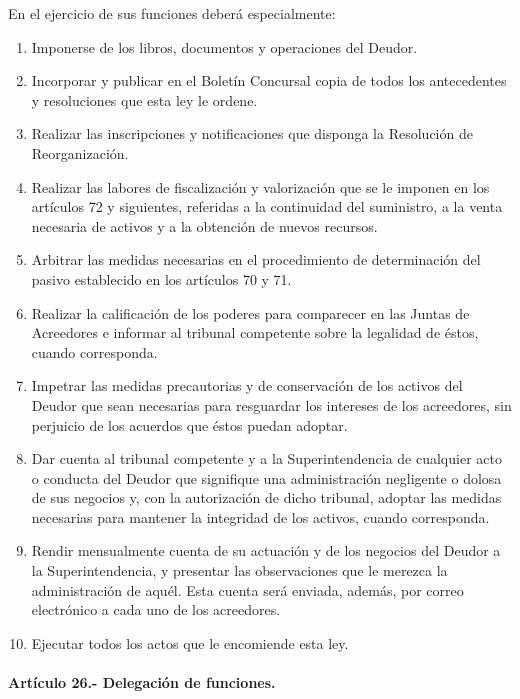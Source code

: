 \documentclass[
]{book}
\begin{document}
En el ejercicio de sus funciones deberá especialmente:

\begin{enumerate}
\def\labelenumi{\arabic{enumi})}
\item
  Imponerse de los libros, documentos y operaciones del Deudor.
\item
  Incorporar y publicar en el Boletín Concursal copia de todos los antecedentes y resoluciones que esta ley le ordene.
\item
  Realizar las inscripciones y notificaciones que disponga la Resolución de Reorganización.
\item
  Realizar las labores de fiscalización y valorización que se le imponen en los artículos 72 y siguientes, referidas a la continuidad del suministro, a la venta necesaria de activos y a la obtención de nuevos recursos.
\item
  Arbitrar las medidas necesarias en el procedimiento de determinación del pasivo establecido en los artículos 70 y 71.
\item
  Realizar la calificación de los poderes para comparecer en las Juntas de Acreedores e informar al tribunal competente sobre la legalidad de éstos, cuando corresponda.
\item
  Impetrar las medidas precautorias y de conservación de los activos del Deudor que sean necesarias para resguardar los intereses de los acreedores, sin perjuicio de los acuerdos que éstos puedan adoptar.
\item
  Dar cuenta al tribunal competente y a la Superintendencia de cualquier acto o conducta del Deudor que signifique una administración negligente o dolosa de sus negocios y, con la autorización de dicho tribunal, adoptar las medidas necesarias para mantener la integridad de los activos, cuando corresponda.
\item
  Rendir mensualmente cuenta de su actuación y de los negocios del Deudor a la Superintendencia, y presentar las observaciones que le merezca la administración de aquél. Esta cuenta será enviada, además, por correo electrónico a cada uno de los acreedores.
\item
  Ejecutar todos los actos que le encomiende esta ley.
\end{enumerate}

\hypertarget{artuxedculo-26.--delegaciuxf3n-de-funciones.}{%
\paragraph*{Artículo 26.- Delegación de funciones.}\label{artuxedculo-26.--delegaciuxf3n-de-funciones.}}
\end{document}
